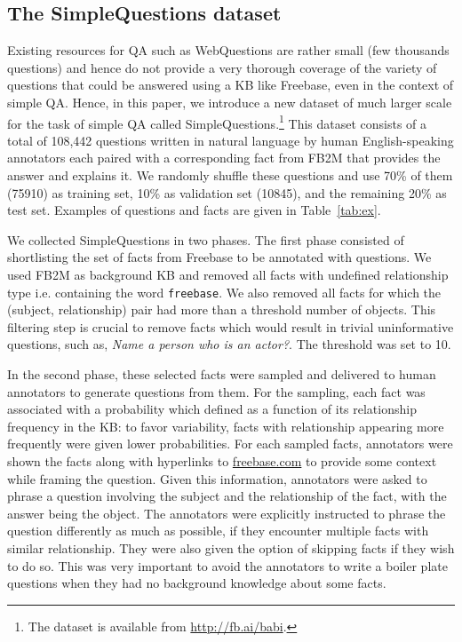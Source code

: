\documentclass[11pt,a4paper]{article}
\newcommand{\fb}{{\sf Freebase}\xspace}
\newcommand{\wq}{{\sf WebQuestions}\xspace}
\newcommand{\fbq}{{\sf SimpleQuestions}\xspace}
\newcommand{\fbs}{{\sf FB2M}\xspace}
\newcommand{\tofact}[1]{{\tt {\small #1}}}
\begin{document}
\subsection{The SimpleQuestions dataset}

Existing resources for QA such as \wq \cite{berant-EtAl:2013:EMNLP} are rather
small (few thousands questions) and hence do not provide a very
thorough coverage of  the variety of questions that could be answered
using a KB like \fb, even in the context of simple QA.
Hence, in this paper, we introduce a new dataset of much larger scale
for the task of simple QA called \fbq.\footnote{The dataset is
  available from \url{http://fb.ai/babi}.}
This dataset consists of a total of 108,442 questions written in
natural language by human English-speaking annotators each paired with
a corresponding fact from \fbs that provides the answer and explains it.
We randomly shuffle these questions and use 70\% of them (75910) as
training set, 10\% as validation set (10845), and the remaining 20\%
as test set.
Examples of questions and facts are given in Table~\ref{tab:ex}.

\iftrue
We collected \fbq in  two phases.
The first phase consisted of shortlisting the set of facts from \fb
to be annotated with questions. 
We used \fbs as background KB and removed
all facts with undefined relationship type i.e. containing the word
\tofact{freebase}. We also removed all facts for which the
(subject, relationship) pair had more than a threshold number
of objects. This filtering step is crucial to remove
facts which would result in trivial uninformative questions, such as,
{\it Name a person who is an actor?}. The threshold was set to 10. 

In the second phase, these selected facts were sampled and delivered
to human annotators to generate questions from them.
For the sampling, each fact was associated with a probability which
defined as a function of its relationship frequency in the KB: to
favor variability, facts with relationship appearing more frequently were
given lower probabilities.
For each sampled facts, annotators were shown the facts along with
hyperlinks to \url{freebase.com} to provide some
context while framing the question. Given this information, annotators were asked to
phrase a question involving the subject and the
relationship of the fact, with the answer being the object.
The annotators were explicitly instructed to phrase the question differently as much as
possible, if they encounter multiple facts with similar relationship.
They were also given the option of skipping facts if they wish to do so.
This was very important to avoid the annotators
to write a boiler plate questions when they had no background
knowledge about some facts.
\fi
\end{document}
